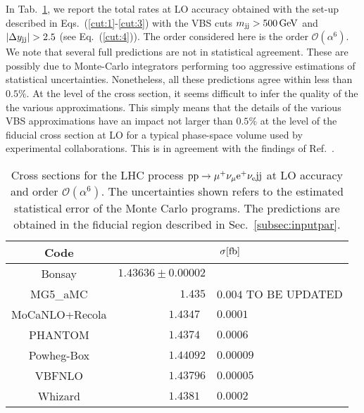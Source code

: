 In Tab.~\ref{tab:wg1_LOrates}, we report the total rates at LO accuracy obtained with the set-up described in Eqs.~(\ref{cut:1}-\ref{cut:3}) with the VBS cuts $m_{\text{j}\text{j}} > 500 \,\text{GeV}$ and $|\Delta y_{\text{j}\text{j}}| > 2.5$ (see Eq.~(\ref{cut:4})).
The order considered here is the order $\mathcal{O}(\alpha^6)$.
We note that several full predictions are not in statistical agreement. These are possibly due to Monte-Carlo 
integrators performing too aggressive estimations of statistical uncertainties. Nonetheless, all these predictions agree within less than $0.5\%$.
At the level of the cross section, it seems difficult to infer the quality of the the various approximations.
This simply means that the details of the various VBS approximations have an impact not larger than $0.5\%$ at 
the level of the fiducial cross section at LO for a typical phase-space volume used by experimental collaborations. This is in agreement with the findings of Ref.~\cite{Oleari:2003tc}.

\begin{table}[h!]
    \centering
    \begin{tabular}{c|r@{ $\pm$ }l}
      Code  &  \multicolumn{2}{c}{$\sigma[\rm{fb}]$}  \\
        \hline
        \hline
        {\sc Bonsay}  &  $1.43636 \pm 0.00002$ \\
        {\sc MG5\_aMC}&  $1.435$ & $0.004$ TO BE UPDATED  \\
        {\sc MoCaNLO+Recola}  &  $1.4347\phantom{0}$ & $0.0001$ \\
        {\sc PHANTOM} &  $1.4374\phantom{0}$ & $0.0006 $  \\
        {\sc Powheg-Box}  &  $1.44092$ & $0.00009$ \\
        {\sc VBFNLO}  &  $1.43796$ & $0.00005$ \\
        {\sc Whizard} &  $1.4381\phantom{0}$ & $0.0002 $
    \end{tabular}
    \caption{\label{tab:wg1_LOrates} Cross sections for the LHC process ${\rm p}{\rm p}\to\mu^+\nu_\mu{\rm e}^+\nu_{\rm e}{\rm j}{\rm j}$ at LO accuracy and order $\mathcal{O}(\alpha^6)$.
    The uncertainties shown refers to the estimated statistical error of the Monte Carlo programs.
    The predictions are obtained in the fiducial region described in Sec.~\ref{subsec:inputpar}.
    }
\end{table}
